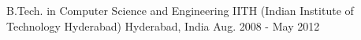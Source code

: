 \begin{cventries}
  \cventry
    {B.Tech. in Computer Science and Engineering}
    {IITH (Indian Institute of Technology Hyderabad)}
    {Hyderabad, India}
    {Aug. 2008 - May 2012}
    {
    }
\end{cventries}
